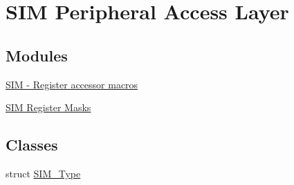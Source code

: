 \hypertarget{group__SIM__Peripheral__Access__Layer}{}\section{S\+IM Peripheral Access Layer}
\label{group__SIM__Peripheral__Access__Layer}
\subsection*{Modules}
\begin{DoxyCompactItemize}
\item 
\hyperlink{group__SIM__Register__Accessor__Macros}{S\+I\+M -\/ Register accessor macros}
\item 
\hyperlink{group__SIM__Register__Masks}{S\+I\+M Register Masks}
\end{DoxyCompactItemize}
\subsection*{Classes}
\begin{DoxyCompactItemize}
\item 
struct \hyperlink{structSIM__Type}{S\+I\+M\+\_\+\+Type}
\end{DoxyCompactItemize}
